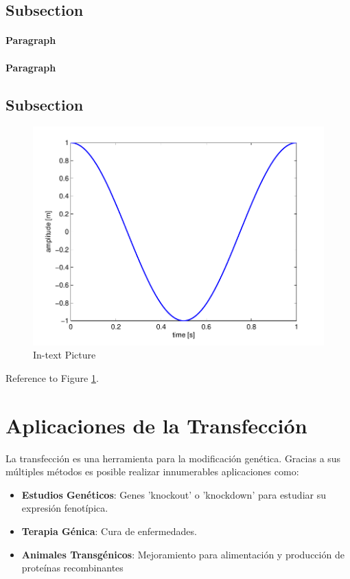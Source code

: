 \documentclass[fleqn,10pt]{SelfArx} %
\begin{document}
\subsection{Subsection}



\paragraph{Paragraph} %
\paragraph{Paragraph} %

\subsection{Subsection}



\begin{figure}[ht]\centering
\includegraphics[width=\linewidth]{images/results}
\caption{In-text Picture}
\label{fig:results}
\end{figure}

Reference to Figure \ref{fig:results}.


\section{Aplicaciones de la Transfección}

La transfección es una herramienta para la modificación genética. Gracias a sus múltiples métodos es posible realizar innumerables aplicaciones como:
\begin{itemize}[noitemsep] %
\item \textbf{Estudios Genéticos}: Genes 'knockout' o 'knockdown' para estudiar su expresión fenotípica.
\item \textbf{Terapia Génica}: Cura de enfermedades.
\item \textbf{Animales Transgénicos}: Mejoramiento para alimentación y producción de proteínas recombinantes
\end{itemize}
\end{document}
